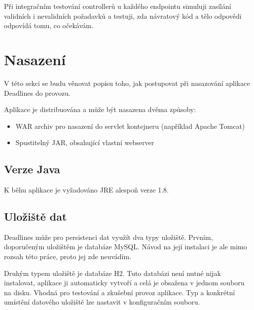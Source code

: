 \documentclass[thesis=B,czech]{FITthesis}[2012/06/26]
\begin{document}
		Při integračním testování controllerů u každého endpointu simuluji zasílání validních i nevalidních požadavků a testuji, zda návratový kód a tělo odpovědi odpovídá tomu, co očekávám. 


\chapter{Nasazení}
	\label{chapter:deployment}
	
	V této sekci se budu věnovat popisu toho, jak postupovat při nasazování aplikace Deadlines do provozu.
	
	Aplikace je distribuována a může být nasazena dvěma způsoby:
	\begin{itemize}
		\item WAR archiv pro nasazení do servlet kontejneru (například Apache Tomcat)
		\item Spustitelný JAR, obsahující vlastní webserver
	\end{itemize}
	
	\section{Verze Java}
		K běhu aplikace je vyžadováno JRE alespoň verze 1.8.
	
	\section{Uložiště dat}
		Deadlines může pro persistenci dat využít dva typy uložiště. Prvním, doporučeným uložištěm je databáze MySQL. Návod na její instalaci je ale mimo rozsah této práce, proto jej zde neuvádím.
	
		Druhým typem uložiště je databáze H2. Tuto databázi není nutné nijak instalovat, aplikace ji automaticky vytvoří a celá je obsažena v jednom souboru na disku. Vhodná pro testování a zkušební provoz aplikace. Typ a konkrétní umístění datového uložiště lze nastavit v konfiguračním souboru.
	
\end{document}
